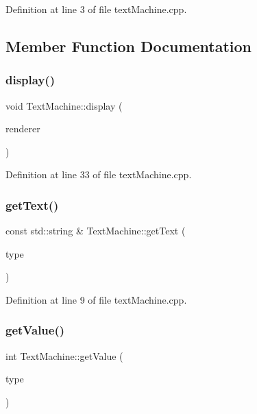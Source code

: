 Definition at line 3 of file text\+Machine.\+cpp.



\subsection{Member Function Documentation}
\mbox{\label{class_text_machine_a9699b1b3d032e021626aff01748a91d6}} 
\subsubsection{display()}
{\footnotesize\ttfamily void Text\+Machine\+::display (\begin{DoxyParamCaption}\item[{S\+D\+L\+\_\+\+Renderer $\ast$}]{renderer }\end{DoxyParamCaption})}



Definition at line 33 of file text\+Machine.\+cpp.

\mbox{\label{class_text_machine_a82f1e99a1e26b2cc47f9aa17c31d1d30}} 
\subsubsection{get\+Text()}
{\footnotesize\ttfamily const std\+::string \& Text\+Machine\+::get\+Text (\begin{DoxyParamCaption}\item[{\textbf{ mv\+::constants\+::text\+Types\+::\+T\+Y\+PE}}]{type }\end{DoxyParamCaption})}



Definition at line 9 of file text\+Machine.\+cpp.

\mbox{\label{class_text_machine_a2ca1a3539231f51a30c5878c3a3e2b01}} 
\subsubsection{get\+Value()}
{\footnotesize\ttfamily int Text\+Machine\+::get\+Value (\begin{DoxyParamCaption}\item[{\textbf{ mv\+::constants\+::text\+Types\+::\+T\+Y\+PE}}]{type }\end{DoxyParamCaption})}




